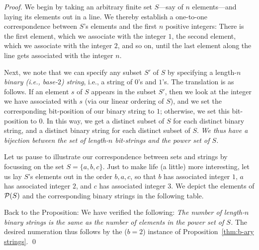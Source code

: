 \begin{proof}
We begin by taking an arbitrary finite set $S$---say of $n$ elements---and laying its elements out in a line.  We thereby establish a one-to-one correspondence between $S$'s elements and the first $n$ positive integers:  There is the first element, which we associate with the integer $1$, the second element, which we associate with the integer $2$, and so on, until the last element along the line gets associated with the integer $n$.

\smallskip

Next, we note that we can specify any subset $S'$ of $S$ by specifying a length-$n$ {\em binary (i.e., base-$2$) string}, i.e., a string of $0$'s and $1$'s.  The translation is as follows.  If an element $s$ of $S$ appears in the subset $S'$, then we look at the integer we have associated with $s$ (via our linear ordering of $S$), and we set the corresponding bit-position of our binary string to $1$; otherwise, we set this bit-position to $0$.  In this way, we get a distinct subset of $S$ for each distinct binary string, and a distinct binary string for each distinct subset of $S$.  {\em We thus have a {\em bijection} between the set of length-$n$ bit-strings and the power set of $S$.}

\smallskip

Let us pause to illustrate our correspondence between sets and strings by focussing on the set $S = \{a,b,c\}$.  Just to make life (a little) more interesting, let us lay $S$'s elements out in the order $b,a,c$, so that $b$ has associated integer $1$, $a$ has associated integer $2$, and $c$ has associated integer $3$.  We depict the elements of $\mbox{$\cal P$}(S)$ and the corresponding binary strings in the following table.
\begin{center}
\end{center}

Back to the Proposition: We have verified the following: {\em The number of length-$n$ binary strings is the same as the number of elements in the power set of $S$.}  The desired numeration thus follows by the ($b=2$) instance of Proposition~\ref{thm:b-ary strings}.  \qed
\end{proof}

